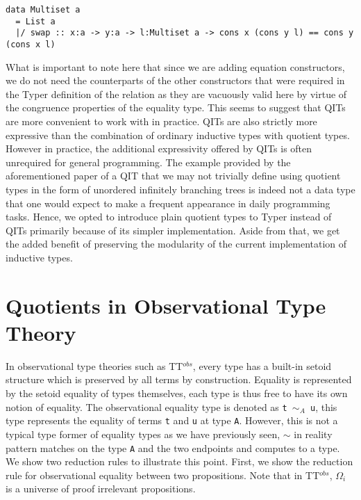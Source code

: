 \documentclass[12pt,twoside,maitrise]{dms}
\theoremstyle{definition}
\numberwithin{equation}{section}
\numberwithin{table}{chapter}
\numberwithin{figure}{chapter}
\newcommand\id[1] {\texttt{#1}}
\newcommand\fn[1] {\texttt{#1}}
\begin{document}
\begin{verbatim}
data Multiset a
  = List a
  |/ swap :: x:a -> y:a -> l:Multiset a -> cons x (cons y l) == cons y (cons x l)
\end{verbatim}

What is important to note here that since we are adding equation constructors,
we do not need the counterparts of the other constructors that were required in
the Typer definition of the relation as they are vacuously valid here by virtue
of the congruence properties of the equality type. This seems to suggest that
QITs are more convenient to work with in practice. QITs are also strictly more
expressive than the combination of ordinary inductive types with quotient
types\cite{fiore2022quotients}. However in practice, the additional expressivity
offered by QITs is often unrequired for general programming. The example
provided by the aforementioned paper of a QIT that we may not trivially define
using quotient types in the form of unordered infinitely branching trees is
indeed not a data type that one would expect to make a frequent appearance in
daily programming tasks. Hence, we opted to introduce plain quotient types to
Typer instead of QITs primarily because of its simpler implementation. Aside
from that, we get the added benefit of preserving the modularity of the current
implementation of inductive types.

\section{Quotients in Observational Type Theory}


In observational type theories such as TT$^{obs}$\cite{pujet2022observational},
every type has a built-in setoid structure which is preserved by all terms by
construction. Equality is represented by the setoid equality of types
themselves, each type is thus free to have its own notion of equality. The
observational equality type is denoted as \fn{t $\sim_A$ u}, this type
represents the equality of terms \id{t} and \id{u} at type \id{A}. However, this
is not a typical type former of equality types as we have previously seen,
$\sim$ in reality pattern matches on the type \id{A} and the two endpoints and
computes to a type. We show two reduction rules to illustrate this point.
First, we show the reduction rule for observational equality between two
propositions. Note that in TT$^{obs}$, $\Omega_i$ is a universe of proof
irrelevant propositions.
\end{document}
